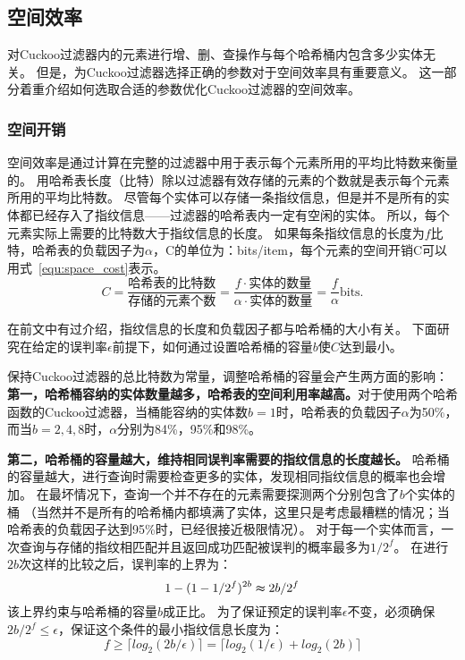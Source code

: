 \subsection{空间效率}
\label{sec:space_ef}
对Cuckoo过滤器内的元素进行增、删、查操作与每个哈希桶内包含多少实体无关。
但是，为Cuckoo过滤器选择正确的参数对于空间效率具有重要意义。
这一部分着重介绍如何选取合适的参数优化Cuckoo过滤器的空间效率。

\subsubsection{空间开销}
空间效率是通过计算在完整的过滤器中用于表示每个元素所用的平均比特数来衡量的。
用哈希表长度（比特）除以过滤器有效存储的元素的个数就是表示每个元素所用的平均比特数。
尽管每个实体可以存储一条指纹信息，但是并不是所有的实体都已经存入了指纹信息——过滤器的哈希表内一定有空闲的实体。
所以，每个元素实际上需要的比特数大于指纹信息的长度。
如果每条指纹信息的长度为$f$比特，哈希表的负载因子为$\alpha$，C的单位为：bits/item，每个元素的空间开销C可以用式~\ref{equ:space_cost}表示。
\begin{equation}
C = \frac{\text{哈希表的比特数}}{\text{存储的元素个数}} = \frac{f\cdot \text{实体的数量}}{\alpha \cdot \text{实体的数量}} = \frac{f}{\alpha} \text{bits.}
\label{equ:space_cost}
\end{equation}

在前文中有过介绍，指纹信息的长度和负载因子都与哈希桶的大小有关。
下面研究在给定的误判率$\epsilon$前提下，如何通过设置哈希桶的容量$b$使$C$达到最小。

保持Cuckoo过滤器的总比特数为常量，调整哈希桶的容量会产生两方面的影响：
\textbf{第一，哈希桶容纳的实体数量越多，哈希表的空间利用率越高。}对于使用两个哈希函数的Cuckoo过滤器，当桶能容纳的实体数$b = 1$时，哈希表的负载因子$\alpha$为50\%，
而当$b = 2,4,8$时，$\alpha$分别为84\%，95\%和98\%。

\textbf{第二，哈希桶的容量越大，维持相同误判率需要的指纹信息的长度越长。}
哈希桶的容量越大，进行查询时需要检查更多的实体，发现相同指纹信息的概率也会增加。
在最坏情况下，查询一个并不存在的元素需要探测两个分别包含了$b$个实体的桶
（当然并不是所有的哈希桶内都填满了实体，这里只是考虑最糟糕的情况；当哈希表的负载因子达到95\%时，已经很接近极限情况）。
对于每一个实体而言，一次查询与存储的指纹相匹配并且返回成功匹配被误判的概率最多为${1/2^f}$。
在进行$2b$次这样的比较之后，误判率的上界为：
\begin{equation}
1 - (1 - {1/2^f})^{2b} \thickapprox {2b/2^f}
\end{equation}
该上界约束与哈希桶的容量$b$成正比。
为了保证预定的误判率$\epsilon$不变，必须确保${2b/2^f}\leq \epsilon$，保证这个条件的最小指纹信息长度为：
\begin{equation}
f \geq \lceil log_2({2b/\epsilon})\rceil = \lceil log_2({1/\epsilon}) + log_2(2b)\rceil  
\label{equ:upper_f}
\end{equation}

